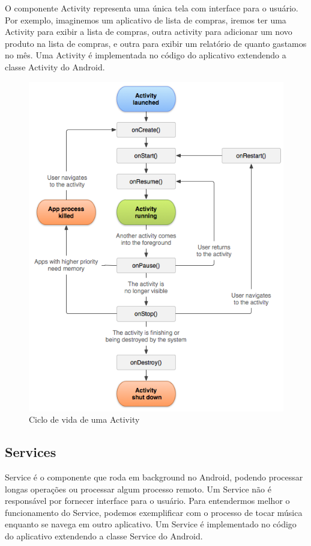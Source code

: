 \documentclass[12pt, %
openright, 
oneside,
a4paper,
brazil]{facom-ufu-abntex2}
\begin{document}
	O componente Activity representa uma única tela com interface para o usuário. Por exemplo, imaginemos um aplicativo de lista de compras, iremos ter uma Activity para exibir a lista de compras, outra activity para adicionar um novo produto na lista de compras, e outra para exibir um relatório de quanto gastamos no mês.
	Uma Activity é implementada no código do aplicativo extendendo a classe Activity do Android.
	
	\begin{figure}[hbt]
  		\includegraphics [scale=.7] {activity_lifecycle}
  		\caption{Ciclo de vida de uma Activity \cite{docAndroid}}
	\end{figure}

	
	\subsection{Services}
	Service é o componente que roda em background no Android, podendo processar longas operações ou processar algum processo remoto. Um Service não é responsável por fornecer interface para o usuário. Para entendermos melhor o funcionamento do Service, podemos exemplificar com o processo de tocar música enquanto se navega em outro aplicativo.
	Um Service é implementado no código do aplicativo extendendo a classe Service do Android.\cite{docAndroid}
	
\end{document}
